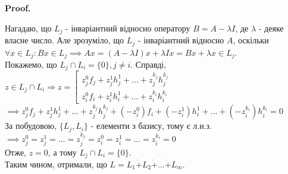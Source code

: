 \documentclass[a4paper, 10pt]{article}
\makeatletter
\theoremstyle{theoremdd}
\renewenvironment{proof}[1][Proof.\\]{\par
\pushQED{\hfill \qed}%
\normalfont \topsep6\p@\@plus6\p@\relax
\trivlist
\item\relax
{\bfseries
#1\@addpunct{.}}\hspace\labelsep\ignorespaces
}{%
\popQED\endtrivlist\@endpefalse
}
\makeatother
\begin{document}
\begin{proof}
Нагадаю, що $L_j$ - інваріантний відносно оператору $B = A-\lambda I$, де $\lambda$ - деяке власне число. Але зрозуміло, що $L_j$ - інваріантний відносно $A$, оскільки\\
$\forall x \in L_j: Bx \in L_j \implies Ax = (A-\lambda I)x + \lambda Ix = Bx + \lambda x \in L_j$.\\
Покажемо, що $L_j \cap L_i = \{0\}, j \neq i$. Справді,\\
$z \in L_j \cap L_i \Rightarrow z = \left[\begin{gathered} z^0_j f_j + z^1_j h^1_j + \dots + z_j^{k_j} h_j^{k_j} \\ z_i^0f_i + z_i^1 h_i^1 + \dots + z_i^{k_i} h_i^{k_i} \end{gathered} \right.$\\
$\implies z^0_j f_j + z^1_j h^1_j + \dots + z_j^{k_j} h_j^{k_j} + (-z_i^0)f_i + (-z_i^1) h_i^1 + \dots + (-z_i^{k_i}) h_i^{k_i} = 0$\\
За побудовою, $\{L_j, L_i\}$ - елементи з базису, тому є л.н.з.\\
$\implies z^0_j = z^1_j = \dots = z^{k_j}_j = z^0_i = z^1_i = \dots = z^{k_i}_i = 0$\\
Отже, $z = 0$, а тому $L_j \cap L_i = \{0\}$.\\
Таким чином, отримали, що $L = L_1 \dot{+} L_2 \dot{+} \dots \dot{+} L_m$.
\end{proof}
\end{document}
